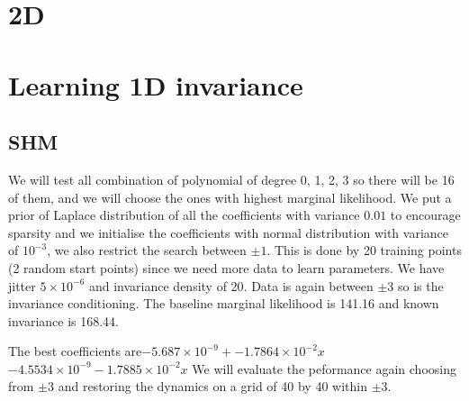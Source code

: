 \documentclass{statsmsc}
\begin{document}
\section{2D}

\section{Learning 1D invariance}
\subsection{SHM}
We will test all combination of polynomial of degree 0, 1, 2, 3 so there will be 16 of them, and we will choose the ones with highest marginal likelihood.
We put a prior of Laplace distribution of all the coefficients with variance $0.01$ to encourage sparsity and we initialise the coefficients with normal distribution with variance of $10^{-3}$, we also restrict the search between $\pm 1$.
This is done by 20 training points (2 random start points) since we need more data to learn parameters.
We have jitter $5\times 10^{-6}$ and invariance density of 20.
Data is again between $\pm 3$ so is the invariance conditioning.
The baseline marginal likelihood is 141.16 and known invariance is 168.44.
\begin{flushleft}
\begin{table}
  \caption{Log marginal likelihood for polynomial of different degree}
  \label{tab:shm_paramertised}
\end{table}
\end{flushleft}
The best coefficients are$-5.687\times 10^{-9}+-1.7864\times 10^{-2}x$
$-4.5534\times 10^{-9}-1.7885\times10^{-2}x$
We will evaluate the peformance again choosing from $\pm 3$ and restoring the dynamics on a grid of 40 by 40 within $\pm 3$.
\end{document}
